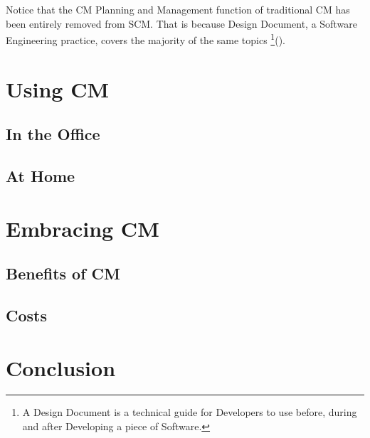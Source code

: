 \documentclass[cmpstyle]{ueacmpstyle}
\begin{document}
		Notice that the CM Planning and Management function of traditional CM has been entirely removed from SCM. That is because Design Document, a Software Engineering practice, covers the majority of the same topics \footnote{A Design Document is a technical guide for Developers to use before, during and after Developing a piece of Software.}(\cite{DesignDocExample}).
		
	\section{Using CM} \label{sec:using}
	
		\subsection{In the Office} \label{sec:office}
		
		\subsection{At Home} \label{sec:home}
		
	\section{Embracing CM} \label{sec:embracing}
	
		\subsection{Benefits of CM} \label{sec:benefits}
		
		\subsection{Costs} \label{sec:costs}
		
	\section{Conclusion} \label{sec:conc}
	
	
	
\end{document}
